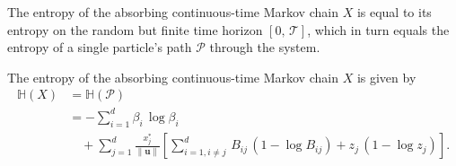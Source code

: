 \documentclass[smallextended]{svjour3}
\renewcommand{\vec}[1]{\mathbf{#1}}
\newcommand{\TT}{\mathcal{T}}
\renewcommand{\H}{\mathbb{H}}
\newcommand{\suml}{\sum\limits}
\newcommand{\vnorms}[1]{\|#1\|}
\begin{document}
The entropy of the absorbing continuous-time Markov chain $X$ is equal to its entropy on the random but finite time horizon $[0,\,\TT]$, which in turn equals the entropy of a single particle's path $\mathcal{P}$ through the system.

\begin{mytheorem}\label{thm:entropy_of_X}
	The entropy of the absorbing continuous-time Markov chain $X$ is given by
	\begin{equation}
    \label{eqn:H_X}
    \begin{aligned}
      \H(X) &= \H(\mathcal{P})\\
      &= -\suml_{i=1}^d\beta_i\,\log\beta_i\\
      &\quad + \suml_{j=1}^d \frac{x^\ast_j}{\vnorms{\vec{u}}}\left[\suml_{i=1,i\neq j}^d \,B_{ij}\,(1-\log B_{ij}) + z_j\,(1-\log z_j)\right].
    \end{aligned}
	\end{equation}
\end{mytheorem}
\end{document}
